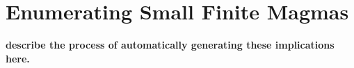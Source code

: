 \chapter{Enumerating Small Finite Magmas}\label{all-small-magmas-chapter}

{\bf describe the process of automatically generating these implications here.}
